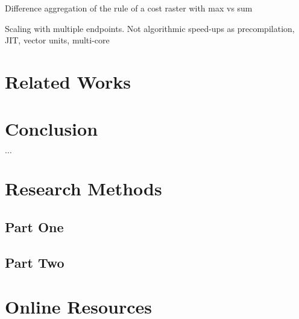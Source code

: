 \documentclass[acmtog]{acmart}
\begin{document}
	Difference aggregation of the rule of a cost raster with max vs sum
	
	Scaling with multiple endpoints.
	Not algorithmic speed-ups as precompilation, JIT, vector units, multi-core
	\section{Related Works}\label{sec:related-works}


	\section{Conclusion}\label{sec:conclusion}



\begin{acks}
	$\ldots$
\end{acks}





\appendix

\section{Research Methods}\label{sec:research-methods}

	\subsection{Part One}\label{subsec:part-one}

	\subsection{Part Two}\label{subsec:part-two}


	\section{Online Resources}\label{sec:online-resources}
\end{document}
